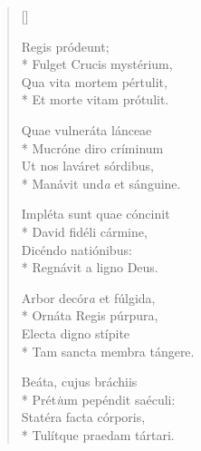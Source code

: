 \newHymn
{}

\begin{multicols}{2}
\begin{verse}[\versewidth]

 Regis pródeunt;\\*
Fulget Crucis mystérium,         \\
Qua vita mortem pértulit,\\*
Et morte vitam prótulit.
\pointtrans


Quae vulneráta lánceae                      \\*
Mucróne diro críminum         \\
Ut nos laváret sórdibus,                   \\*
Manávit und\emph{a} et sánguine.                   

Impléta sunt quae cóncinit                  \\*
David fidéli cármine,                       \\
Dicéndo natiónibus:                         \\*
Regnávit a ligno Deus.                      

Arbor decór\emph{a} et fúlgida,                    \\*
Ornáta Regis púrpura,                       \\
Electa digno stípite              \\*
Tam sancta membra tángere.                  

Beáta, cujus bráchiis                       \\*
Prét\emph{i}um pepéndit saéculi:                   \\
Statéra facta córporis,                     \\*
Tulítque praedam tártari.



\end{verse}
\end{multicols}
